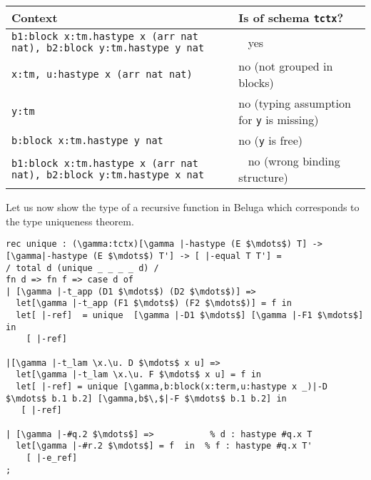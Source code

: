 \begin{center}
\begin{tabular}{p{7.5cm}|p{8cm}}
\hspace{2cm}Context & \hspace{1.5cm}Is of schema \lstinline!tctx!?\\
\hline 
\lstinline!b1:block x:tm.hastype x (arr nat nat), b2:block y:tm.hastype y nat!
& \mbox{\hspace{6cm} } yes \\ \hline
\lstinline!x:tm, u:hastype x (arr nat nat)! & no (not grouped in blocks)
\\\hline
\lstinline!y:tm! & no (typing assumption for \lstinline!y! is
missing) \\\hline
\lstinline!b:block x:tm.hastype y nat! & no (\lstinline!y! is free) \\
\hline
\lstinline!b1:block x:tm.hastype x (arr nat nat), b2:block y:tm.hastype x nat! 
& \mbox{\hspace{6cm} } no (wrong binding structure)
\end{tabular}  
\end{center}



Let us now show the type of a recursive function in Beluga which
corresponds to the type uniqueness theorem.


\begin{lstlisting}[caption={Type Uniqueness Proof},label=list:8-6,captionpos=b,float,abovecaptionskip=-\medskipamount]
rec unique : (\gamma:tctx)[\gamma |-hastype (E $\mdots$) T] -> [\gamma|-hastype (E $\mdots$) T'] -> [ |-equal T T'] =  
/ total d (unique _ _ _ _ d) /
fn d => fn f => case d of
| [\gamma |-t_app (D1 $\mdots$) (D2 $\mdots$)] =>
  let[\gamma |-t_app (F1 $\mdots$) (F2 $\mdots$)] = f in
  let[ |-ref]  = unique  [\gamma |-D1 $\mdots$] [\gamma |-F1 $\mdots$] in
    [ |-ref]

|[\gamma |-t_lam \x.\u. D $\mdots$ x u] =>
  let[\gamma |-t_lam \x.\u. F $\mdots$ x u] = f in
  let[ |-ref] = unique [\gamma,b:block(x:term,u:hastype x _)|-D $\mdots$ b.1 b.2] [\gamma,b$\,$|-F $\mdots$ b.1 b.2] in
   [ |-ref]

| [\gamma |-#q.2 $\mdots$] =>           % d : hastype #q.x T
  let[\gamma |-#r.2 $\mdots$] = f  in  % f : hastype #q.x T'
    [ |-e_ref]
; 
\end{lstlisting}


